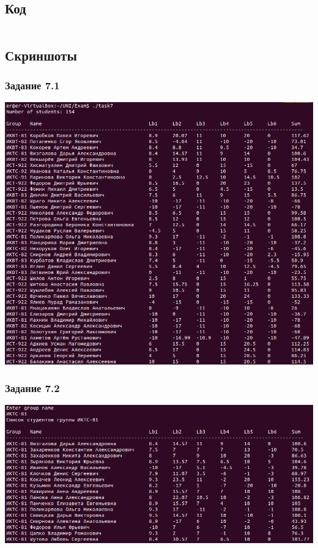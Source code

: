 \documentclass{article}
\begin{document}
    \subsection{Код}

        \inputminted[frame=single, fontsize=\small]{cpp}{task7/task7.cpp}

    \subsection{Скриншоты}

        \subsubsection{Задание 7.1}

            \includegraphics[scale=0.35]{task7/task7.1.png}

        \subsubsection{Задание 7.2}

            \includegraphics[scale=0.35]{task7/task7.2.png}
\end{document}
